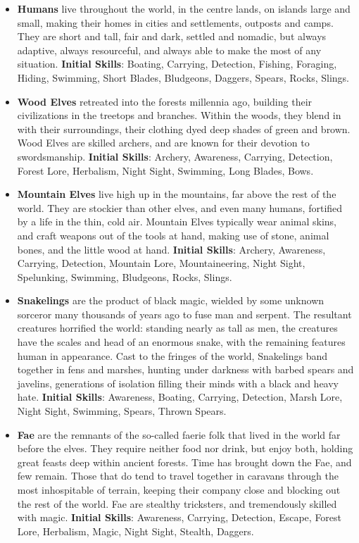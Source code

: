 \documentclass{article}
\begin{document}
\begin{itemize}
\item {\bf Humans} live throughout the world, in the centre lands, on
islands large and small, making their homes in cities and settlements, 
outposts and camps.  They are short and tall, fair and dark, settled and 
nomadic, but always adaptive, always resourceful, and always able to make 
the most of any situation. \textbf{Initial Skills}: Boating, Carrying,
Detection, Fishing, Foraging, Hiding, Swimming, Short Blades, Bludgeons,
Daggers, Spears, Rocks, Slings.

\item {\bf Wood Elves} retreated into the forests millennia ago, building 
their civilizations in the treetops and branches.  Within the woods, they 
blend in with their surroundings, their clothing dyed deep shades of green 
and brown.  Wood Elves are skilled archers, and are known for their 
devotion to swordsmanship. \textbf{Initial Skills}: Archery, Awareness,
Carrying, Detection, Forest Lore, Herbalism, Night Sight, Swimming,
Long Blades, Bows.

\item {\bf Mountain Elves} live high up in the mountains, far above the 
rest of the world.  They are stockier than other elves, and even many 
humans, fortified by a life in the thin, cold air.  Mountain Elves 
typically wear animal skins, and craft weapons out of the tools at hand, 
making use of stone, animal bones, and the little wood at hand.
\textbf{Initial Skills}: Archery, Awareness, Carrying, Detection, 
Mountain Lore, Mountaineering, Night Sight, Spelunking, Swimming,
Bludgeons, Rocks, Slings.

\item {\bf Snakelings} are the product of black magic, wielded by some
unknown sorceror many thousands of years ago to fuse man and serpent. 
The resultant creatures horrified the world: standing nearly as tall as men,
the creatures have the scales and head of an enormous snake, with the 
remaining features human in appearance.  Cast to the fringes of the world, 
Snakelings band together in fens and marshes, hunting under darkness with 
barbed spears and javelins, generations of isolation filling their minds 
with a black and heavy hate. \textbf{Initial Skills}: Awareness, Boating,
Carrying, Detection, Marsh Lore, Night Sight, Swimming, Spears, Thrown
Spears.

\item {\bf Fae} are the remnants of the so-called faerie folk that lived in
the world far before the elves.  They require neither food nor drink, but 
enjoy both, holding great feasts deep within ancient forests.  Time has 
brought down the Fae, and few remain.  Those that do tend to travel 
together in caravans through the most inhospitable of terrain, keeping 
their company close and blocking out the rest of the world.  Fae are 
stealthy tricksters, and tremendously skilled with magic. 
\textbf{Initial Skills}: Awareness, Carrying, Detection, Escape, Forest
Lore, Herbalism, Magic, Night Sight, Stealth, Daggers.


\end{itemize}
\end{document}
